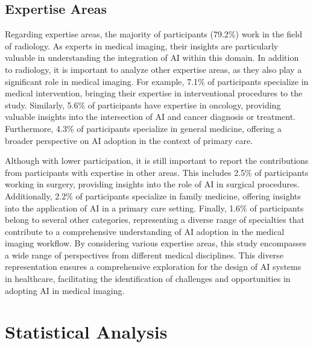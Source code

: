 \subsection{Expertise Areas}
\label{chap:app002003003}

Regarding expertise areas, the majority of participants (79.2\%) work in the field of radiology.
As experts in medical imaging, their insights are particularly valuable in understanding the integration of \ac{AI} within this domain.
In addition to radiology, it is important to analyze other expertise areas, as they also play a significant role in medical imaging.
For example, 7.1\% of participants specialize in medical intervention, bringing their expertise in interventional procedures to the study.
Similarly, 5.6\% of participants have expertise in oncology, providing valuable insights into the intersection of \ac{AI} and cancer diagnosis or treatment.
Furthermore, 4.3\% of participants specialize in general medicine, offering a broader perspective on \ac{AI} adoption in the context of primary care.

Although with lower participation, it is still important to report the contributions from participants with expertise in other areas.
This includes 2.5\% of participants working in surgery, providing insights into the role of \ac{AI} in surgical procedures.
Additionally, 2.2\% of participants specialize in family medicine, offering insights into the application of AI in a primary care setting. Finally, 1.6\% of participants belong to several other categories, representing a diverse range of specialties that contribute to a comprehensive understanding of AI adoption in the medical imaging workflow.
By considering various expertise areas, this study encompasses a wide range of perspectives from different medical disciplines.
This diverse representation ensures a comprehensive exploration for the design of \ac{AI} systems in healthcare, facilitating the identification of challenges and opportunities in adopting \ac{AI} in medical imaging.

\section{Statistical Analysis}
\label{chap:app002004}

